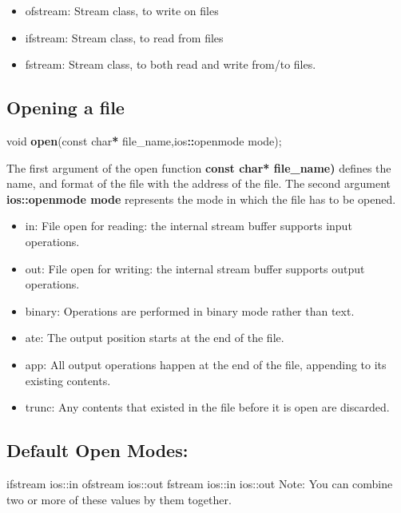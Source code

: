 \documentclass[
]{article}
\newenvironment{Shaded}{\begin{snugshade}}{\end{snugshade}}
\newcommand{\FunctionTok}[1]{\textcolor[rgb]{0.13,0.29,0.53}{\textbf{#1}}}
\newcommand{\NormalTok}[1]{#1}
\newcommand{\SpecialCharTok}[1]{\textcolor[rgb]{0.81,0.36,0.00}{\textbf{#1}}}
\providecommand{\tightlist}{%
  \setlength{\itemsep}{0pt}\setlength{\parskip}{0pt}}
\begin{document}
\begin{itemize}
\tightlist
\item
  ofstream: Stream class, to write on files
\item
  ifstream: Stream class, to read from files
\item
  fstream: Stream class, to both read and write from/to files.
\end{itemize}

\subsection{Opening a file}\label{opening-a-file}

\begin{Shaded}
\begin{Highlighting}[]
\NormalTok{void }\FunctionTok{open}\NormalTok{(const char}\SpecialCharTok{*}\NormalTok{ file\_name,ios}\SpecialCharTok{::}\NormalTok{openmode mode);}
\end{Highlighting}
\end{Shaded}

The first argument of the open function \textbf{const char* file\_name)}
defines the name, and format of the file with the address of the file.
The second argument \textbf{ios::openmode mode} represents the mode in
which the file has to be opened.

\begin{itemize}
\tightlist
\item
  in: File open for reading: the internal stream buffer supports input
  operations.
\item
  out: File open for writing: the internal stream buffer supports output
  operations.
\item
  binary: Operations are performed in binary mode rather than text.
\item
  ate: The output position starts at the end of the file.
\item
  app: All output operations happen at the end of the file, appending to
  its existing contents.
\item
  trunc: Any contents that existed in the file before it is open are
  discarded.
\end{itemize}

\subsection{Default Open Modes:}\label{default-open-modes}

ifstream ios::in ofstream ios::out fstream ios::in \textbar{} ios::out
Note: You can combine two or more of these values by \textbar{} them
together.
\end{document}

